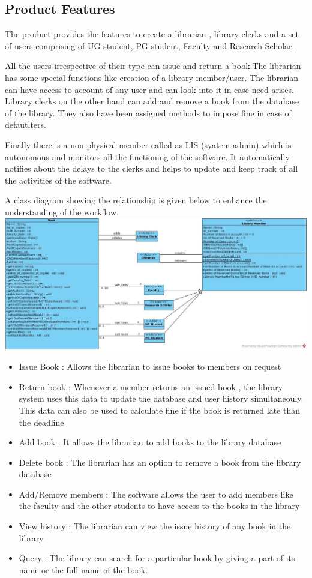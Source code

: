 \documentclass{article}
\begin{document}
\subsection{Product Features}
The product provides the features to create a librarian , library clerks and a set of users comprising of UG student, PG student, Faculty and Research Scholar.

All the users irrespective of their type can issue and return a book.The librarian has some special functions like creation of a library member/user. The librarian can have access to account of any user and can look into it in case need arises.
Library clerks on the other hand can add and remove a book from the database of the library. They also have been assigned methods to impose fine in case of defautlters.

Finally there is a non-physical member called as LIS (syatem admin) which is autonomous and monitors all the finctioning of the software. It automatically notifies about the delays to the clerks and helps to update and keep track of all the activities of the software.

A class diagram showing the relationship is given below to enhance the understanding of the workflow.
\\
\includegraphics[scale=0.25]{images/classDiagram}
\\
\begin{itemize}
\item Issue Book : Allows the librarian to issue books to members on request
\item Return book : Whenever a member returns an issued book , the library system uses this data to update the database and user history simultaneouly. This data can also be used to calculate fine if the book is returned late than the deadline
\item Add book : It allows the librarian to add books to the library database
\item Delete book : The librarian has an option to remove a book from the library database
\item Add/Remove members : The software allows the user to add members like the faculty and the other students to have access to the books in the library
\item View history : The librarian can view the issue history of any book in the library
\item Query : The library can search for a particular book by giving a part of its name or the full name of the book.
\end{itemize}
\end{document}
